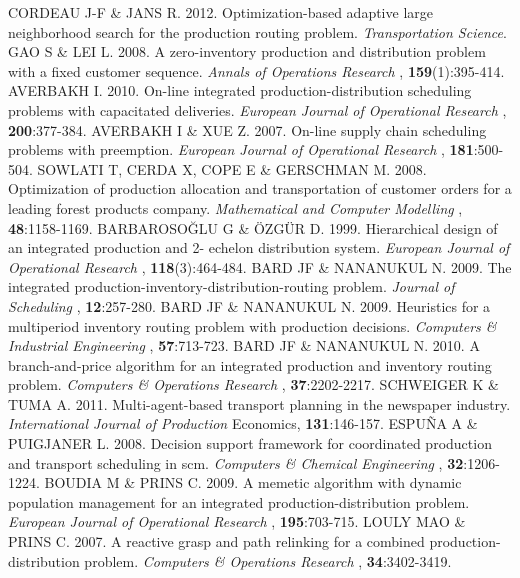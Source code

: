 \begin{biblio}[REFERENCES]
 CORDEAU J-F \& JANS R. 2012. Optimization-based
 adaptive large neighborhood search for the production routing problem.
 \textit{Transportation Science}.
 GAO S \& LEI L. 2008. A zero-inventory production
 and distribution problem with a fixed customer sequence. \textit{Annals of Operations
 Research} , \textbf{159}(1):395-414.
\tit{ }AVERBAKH I. 2010. On-line integrated production-distribution
 scheduling problems with capacitated deliveries. \textit{European Journal of
 Operational Research} , \textbf{200}:377-384.
\tit{ }AVERBAKH I \& XUE Z. 2007. On-line supply chain scheduling
 problems with preemption. \textit{European Journal of Operational Research} ,
 \textbf{181}:500-504.
 SOWLATI T, CERDA X, COPE E \& GERSCHMAN M. 2008.
 Optimization of production allocation and transportation of customer orders for a
 leading forest products company. \textit{Mathematical and Computer
 Modelling} , \textbf{48}:1158-1169.
\tit{ }BARBAROSOĞLU G \& ÖZGÜR D. 1999. Hierarchical design of an
 integrated production and 2- echelon distribution system. \textit{European Journal of
 Operational Research} , \textbf{118}(3):464-484.
\tit{ }BARD JF \& NANANUKUL N. 2009. The integrated
 production-inventory-distribution-routing problem. \textit{Journal of
 Scheduling} , \textbf{12}:257-280.
\tit{[8] }BARD JF \& NANANUKUL N. 2009. Heuristics for a multiperiod
 inventory routing problem with production decisions. \textit{Computers \&
 Industrial Engineering} , \textbf{57}:713-723.
\tit{ }BARD JF \& NANANUKUL N. 2010. A branch-and-price algorithm for an
 integrated production and inventory routing problem. \textit{Computers \&
 Operations Research} , \textbf{37}:2202-2217.
 SCHWEIGER K \& TUMA A. 2011. Multi-agent-based
 transport planning in the newspaper industry. \textit{International Journal of
 Production} Economics, \textbf{131}:146-157.
 ESPUÑA A \& PUIGJANER L. 2008. Decision support
 framework for coordinated production and transport scheduling in scm.
 \textit{Computers \& Chemical Engineering} ,
 \textbf{32}:1206-1224.
\tit{ }BOUDIA M \& PRINS C. 2009. A memetic algorithm with dynamic
 population management for an integrated production-distribution problem.
 \textit{European Journal of Operational Research} ,
 \textbf{195}:703-715.
 LOULY MAO \& PRINS C. 2007. A reactive grasp and path
 relinking for a combined production-distribution problem. \textit{Computers \&
 Operations Research} , \textbf{34}:3402-3419.

\end{biblio}
